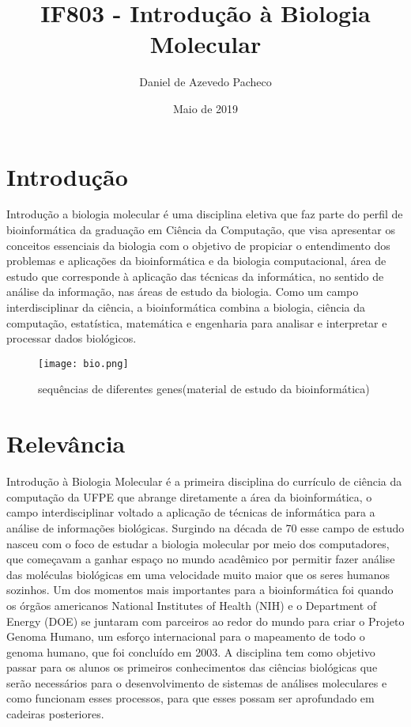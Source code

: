 \documentclass{article}
\title{IF803 - Introdução à Biologia Molecular}
\author{Daniel de Azevedo Pacheco }
\date{Maio de 2019}
\begin{document}
\maketitle

\section{Introdução}
Introdução a biologia molecular é uma disciplina eletiva que faz parte do perfil de bioinformática da graduação em Ciência da Computação, que visa apresentar os conceitos essenciais da biologia com o objetivo de propiciar o entendimento dos problemas e aplicações da bioinformática e da biologia computacional\cite{site}, área de estudo que corresponde à aplicação das técnicas da informática, no sentido de análise da informação, nas áreas de estudo da biologia. Como um campo interdisciplinar da ciência, a bioinformática combina a biologia, ciência da computação, estatística, matemática e engenharia para analisar e interpretar e processar dados biológicos. 

\begin{figure}[h]
    \centering
    \texttt{[image: bio.png]}
    \caption{sequências de diferentes genes(material de estudo da bioinformática) \cite{img}}
    \label{fig:my_label}
\end{figure}

\section{Relevância}
Introdução à Biologia Molecular é a primeira disciplina do currículo de ciência da computação da UFPE que abrange diretamente a área da bioinformática, o campo interdisciplinar voltado a aplicação de técnicas de informática para a análise de informações biológicas. Surgindo na década de 70 esse campo de estudo nasceu com o foco de estudar a biologia molecular por meio dos computadores, que começavam a ganhar espaço no mundo acadêmico por permitir fazer análise das moléculas biológicas em uma velocidade muito maior que os seres humanos sozinhos\cite{slide1}.
Um dos momentos mais importantes para a bioinformática foi quando os órgãos americanos National Institutes of Health (NIH) e o Department of Energy (DOE) se juntaram com parceiros ao redor do mundo para criar o Projeto Genoma Humano, um esforço internacional para o mapeamento de todo o genoma humano, que foi concluído em 2003.\cite{slide2}
A disciplina tem como objetivo passar para os alunos os primeiros conhecimentos das ciências biológicas que serão necessários para o desenvolvimento de sistemas de análises moleculares e como funcionam esses processos, para que esses possam ser aprofundado em cadeiras posteriores. 
\end{document}
